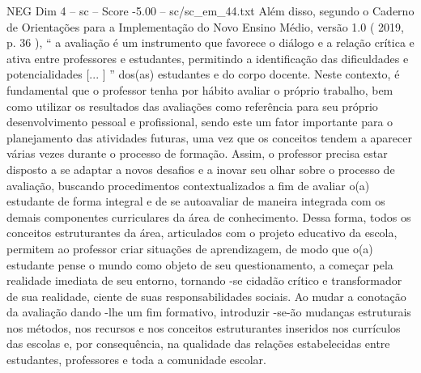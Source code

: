\begin{textsample}{NEG Dim 4 – sc – Score -5.00 – sc/sc\_em\_44.txt}
Além disso, segundo o Caderno de Orientações para a Implementação do Novo Ensino Médio, versão 1.0 ( 2019, p. 36 ), “ a avaliação é um instrumento que favorece o diálogo e a relação crítica e ativa entre professores e estudantes, permitindo a identificação das dificuldades e potencialidades [... ] ” dos(as) estudantes e do corpo docente.
Neste contexto, é fundamental que o professor tenha por hábito avaliar o próprio trabalho, bem como utilizar os resultados das avaliações como referência para seu próprio desenvolvimento pessoal e profissional, sendo este um fator importante para o planejamento das atividades futuras, uma vez que os conceitos tendem a aparecer várias vezes durante o processo de formação.
Assim, o professor precisa estar disposto a se adaptar a novos desafios e a inovar seu olhar sobre o processo de avaliação, buscando procedimentos contextualizados a fim de avaliar o(a) estudante de forma integral e de se autoavaliar de maneira integrada com os demais componentes curriculares da área de conhecimento.
Dessa forma, todos os conceitos estruturantes da área, articulados com o projeto educativo da escola, permitem ao professor criar situações de aprendizagem, de modo que o(a) estudante pense o mundo como objeto de seu questionamento, a começar pela realidade imediata de seu entorno, tornando -se cidadão crítico e transformador de sua realidade, ciente de suas responsabilidades sociais.
Ao mudar a conotação da avaliação dando -lhe um fim formativo, introduzir -se-ão mudanças estruturais nos métodos, nos recursos e nos conceitos estruturantes inseridos nos currículos das escolas e, por consequência, na qualidade das relações estabelecidas entre estudantes, professores e toda a comunidade escolar.

\end{textsample}
